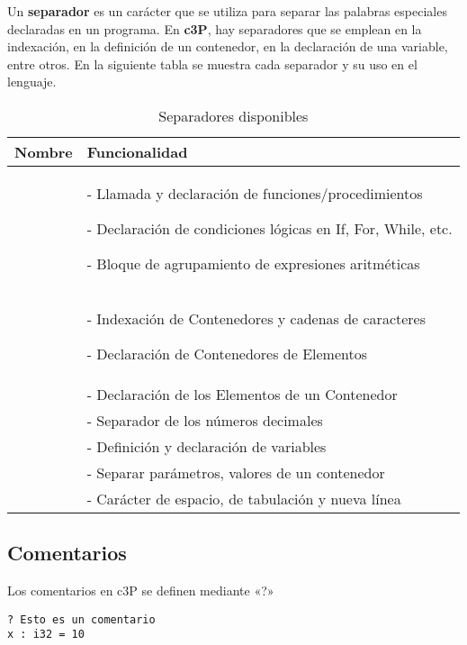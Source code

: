 Un \textbf{separador} es un carácter que se utiliza para separar las palabras especiales
declaradas en un programa. En \textbf{c3P}, hay separadores que se emplean en la indexación,
en la definición de un contenedor, en la declaración de una variable, entre otros. En la
siguiente tabla se muestra cada separador y su uso en el lenguaje.

\begin{table}[H]
    \centering
    \begin{tabular}{|c|p{10cm}|}
         \hline
         \textbf{Nombre} & \textbf{Funcionalidad}  \\
         \hline
         \multirow{3}{*}{\centering{( )}} &
         - Llamada y declaración de funciones/procedimientos \par
         - Declaración de condiciones lógicas en If, For, While, etc. \par
         - Bloque de agrupamiento de expresiones aritméticas \\
         \hline
         \multirow{2}{*}{\centering{[ ]}} &
         - Indexación de Contenedores y cadenas de caracteres \par
         - Declaración de Contenedores de Elementos \\
         \hline
         \multirow{1}{*}{\centering{\{ \}}}
         & - Declaración de los Elementos de un Contenedor \\
         \hline
         \multirow{1}{*}{\centering{.}}
         & - Separador de los números decimales \\
         \hline
         \multirow{1}{*}{\centering{:}}
         & - Definición y declaración de variables \\
         \hline
         \multirow{1}{*}{\centering{,}}
         & - Separar parámetros, valores de un contenedor \\
         \hline
         \multirow{1}{*}{\centering{SPACE}}
          & - Carácter de espacio, de tabulación y nueva línea \\
         \hline
    \end{tabular}
    \caption{Separadores disponibles}
    \label{tab:tab_separadores_disponibles}
\end{table}

\subsection{Comentarios}

Los comentarios en c3P se definen mediante «?»

\begin{verbatim}
? Esto es un comentario
x : i32 = 10
\end{verbatim}

